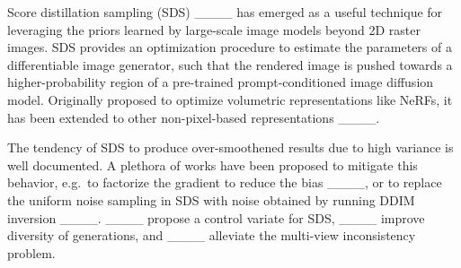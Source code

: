 Score distillation sampling (SDS) ____ has emerged as a useful technique for leveraging the priors learned by large-scale image models beyond 2D raster images. SDS provides an optimization procedure to estimate the parameters of a differentiable image generator, such that the rendered image is pushed towards a higher-probability region of a pre-trained prompt-conditioned image diffusion model. Originally proposed to optimize volumetric representations like NeRFs, it has been extended to other non-pixel-based representations ____.

The tendency of SDS to produce over-smoothened results due to high variance is well documented. A plethora of works have been proposed to mitigate this behavior, e.g.\ to factorize the gradient to reduce the bias ____, or
to replace the uniform noise sampling in SDS with noise obtained by running DDIM inversion ____. ____ propose a control variate for SDS, ____ improve diversity of generations, and ____ alleviate the multi-view inconsistency problem.


